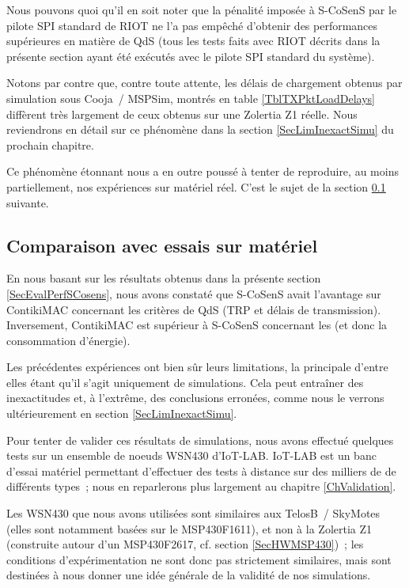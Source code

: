Nous pouvons quoi qu'il en soit noter que la pénalité imposée à S-CoSenS
par le pilote SPI standard de RIOT ne l'a pas empêché d'obtenir des
performances supérieures en matière de QdS (tous les tests faits avec
RIOT décrits dans la présente section ayant été exécutés avec le
pilote SPI standard du système).

\bigskip

Notons par contre que, contre toute attente, les délais de chargement
obtenus par simulation sous Cooja~/ MSPSim, montrés en table
\vref{TblTXPktLoadDelays} diffèrent très largement de ceux obtenus
sur une  Zolertia Z1 réelle. Nous reviendrons en détail sur ce
phénomène dans la section \vref{SecLimInexactSimu} du prochain chapitre.

Ce phénomène étonnant nous a en outre poussé à tenter de reproduire,
au moins partiellement, nos expériences sur matériel réel. C'est le sujet
de la section \ref{SubsecExpMat} suivante.


\subsection{Comparaison avec essais sur matériel}
\label{SubsecExpMat}

En nous basant sur les résultats obtenus dans la présente section
\ref{SecEvalPerfSCosens}, nous avons constaté que S-CoSenS avait
l'avantage sur ContikiMAC concernant les critères de QdS (TRP et délais
de transmission). Inversement, ContikiMAC est supérieur à S-CoSenS
concernant les  (et donc la consommation d'énergie).

Les précédentes expériences ont bien sûr leurs limitations, la principale
d'entre elles étant qu'il s'agit uniquement de simulations. Cela peut
entraîner des inexactitudes et, à l'extrême, des conclusions erronées,
comme nous le verrons ultérieurement en section \vref{SecLimInexactSimu}.

Pour tenter de valider ces résultats de simulations, nous avons effectué
quelques tests sur un ensemble de noeuds WSN430 d'IoT-LAB. IoT-LAB
\cite{IotLAB} est un banc d'essai matériel permettant d'effectuer des tests
à distance sur des milliers de  de différents types~; nous
en reparlerons plus largement au chapitre \vref{ChValidation}.

Les  WSN430 que nous avons utilisées sont similaires aux
TelosB~/ SkyMotes (elles sont notamment basées sur le MSP430F1611),
et non à la Zolertia Z1 (construite autour d'un MSP430F2617, cf. section
\vref{SecHWMSP430})~; les conditions d'expérimentation ne sont donc
pas strictement similaires, mais sont destinées à nous donner une idée
générale de la validité de nos simulations.

